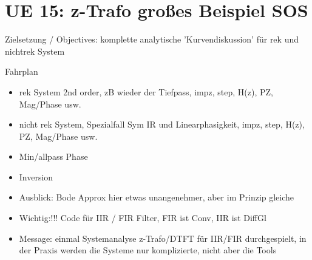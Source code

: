 \newpage
\section{UE 15: z-Trafo großes Beispiel SOS}
Zielsetzung / Objectives: komplette analytische 'Kurvendiskussion' für rek und nichtrek System

Fahrplan
\begin{itemize}
\item rek System 2nd order, zB wieder der Tiefpass, impz, step, H(z), PZ, Mag/Phase usw.
\item nicht rek System, Spezialfall Sym IR und Linearphasigkeit, impz, step, H(z), PZ, Mag/Phase usw.
\item Min/allpass Phase
\item Inversion
\item Ausblick: Bode Approx hier etwas unangenehmer, aber im Prinzip gleiche
\item Wichtig:!!! Code für IIR / FIR Filter, FIR ist Conv, IIR ist DiffGl
\item Message: einmal Systemanalyse z-Trafo/DTFT für IIR/FIR durchgespielt, in der Praxis werden die Systeme nur komplizierte, nicht aber die Tools
\end{itemize}
